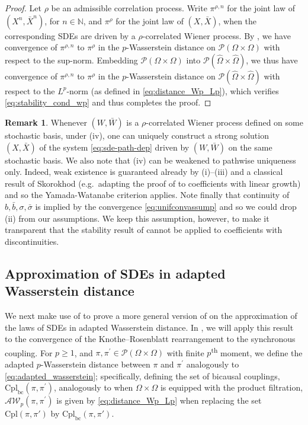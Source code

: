 \documentclass[oneside]{amsart}
\theoremstyle{definition}
\newtheorem{remark}[theorem]{Remark}
\newcommand{\AW}{\mathcal A\mathcal W}
\newcommand{\N}{\mathbb N}
\newcommand{\Pc}{\mathcal P}
\newcommand{\cpl}{\mathrm{Cpl}}
\newcommand{\cplbc}{\mathrm{Cpl}_{\mathrm{bc}}}
\numberwithin{equation}{section}
\begin{document}
\begin{proof}
	Let $\rho$ be an admissible correlation process. Write $\pi^{\rho, n}$ for the joint law of $(X^n,\bar X^n)$, for $n \in \N$, and $\pi^\rho$ for the joint law of $(X,\bar X)$, when the corresponding SDEs are driven by a $\rho$-correlated Wiener process. By , we have convergence of $\pi^{\rho,n}$ to $\pi^\rho$ in the $p$-Wasserstein distance on $\Pc(\Omega \times \Omega)$ with respect to the sup-norm. 
	Embedding $\Pc(\Omega\times\Omega)$ into $\Pc(\hat\Omega\times\hat\Omega)$, we thus have convergence of $\pi^{\rho,n}$ to $\pi^\rho$ in the $p$-Wasserstein distance on $\Pc(\hat\Omega\times\hat\Omega)$ with respect to the $L^p$-norm (as defined in \eqref{eq:distance_Wp_Lp}), which verifies \eqref{eq:stability_cond_wp} and thus completes the proof. 
\end{proof}

\begin{remark}\label{rem:corr_uniqueness}
Whenever $(W,\bar W)$ is a $\rho$-correlated Wiener process defined on some stochastic basis, under  (iv), one can uniquely construct a strong solution $(X,\bar X)$ of the system \eqref{eq:sde-path-dep} driven by $(W,\bar W)$ on the same stochastic basis.
We also note that  (iv) can be weakened to pathwise uniqueness only. Indeed, weak existence is guaranteed already by  (i)--(iii) and a classical result of Skorokhod (e.g.\ adapting the proof of \cite[Theorem 21.9]{Kall02} to coefficients with linear growth) and so the Yamada-Watanabe criterion \cite[Lemma 21.17]{Kall02} applies.
	Note finally that continuity of $b, \bar b, \sigma, \bar \sigma$ is implied by the convergence \eqref{eq:unifconvassump} and so we could drop  (ii) from our assumptions. We keep this assumption, however, to make it transparent that the stability result of  cannot be applied to coefficients with discontinuities. 
\end{remark}


\subsection{Approximation of SDEs in adapted Wasserstein distance}


We next make use of  to prove a more general version of  on the approximation of the laws of SDEs in adapted Wasserstein distance. In , we will apply this result to the convergence of the Knothe--Rosenblatt rearrangement to the synchronous coupling.
For $p \ge 1$, and $\pi,\pi^\prime\in \Pc(\Omega \times \Omega)$ with finite $p$\textsuperscript{th} moment, we define the adapted $p$-Wasserstein distance between $\pi$ and $\pi^\prime$ analogously to \eqref{eq:adapted_wasserstein}; specifically, defining the set of bicausal couplings, $\cplbc(\pi,\pi^\prime)$, analogously to  when $\Omega\times\Omega$ is equipped with the product filtration, $\AW_p(\pi,\pi^\prime)$ is given by \eqref{eq:distance_Wp_Lp} when replacing the set $\cpl(\pi,\pi')$ by $\cplbc(\pi,\pi')$. 
\end{document}
